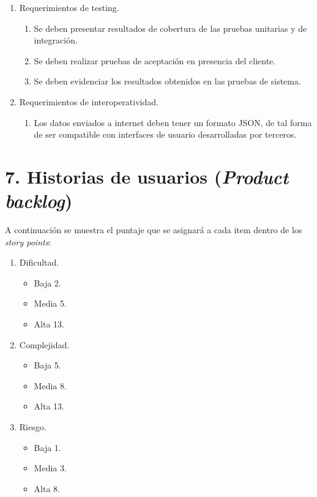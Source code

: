 \documentclass[
11pt, %
codirector, %
]{charter}
\begin{document}
\begin{enumerate}
	\item Requerimientos de testing.
		\begin{enumerate}
			\item Se deben presentar resultados de cobertura de las pruebas unitarias y de integración.
			\item Se deben realizar pruebas de aceptación en presencia del cliente.
			\item Se deben evidenciar los resultados obtenidos en las pruebas de sistema.
		\end{enumerate}

	\item Requerimientos de interoperatividad.
		\begin{enumerate}
			\item Los datos enviados a internet deben tener un formato JSON, de tal forma de ser compatible con interfaces de usuario desarrolladas por terceros.
		\end{enumerate}
					
\end{enumerate}

\section{7. Historias de usuarios (\textit{Product backlog})}
\label{sec:backlog}

A continuación se muestra el puntaje que se asignará a cada item dentro de los \textit{story points}:

\begin{enumerate}
	\item Dificultad.
	\begin{itemize}
		\item Baja 2.
		\item Media 5.
		\item Alta 13.
	\end{itemize}

\item Complejidad.
	\begin{itemize}
		\item Baja 5.
		\item Media 8.
		\item Alta 13.
	\end{itemize}

\item Riesgo.
	\begin{itemize}
		\item Baja 1.
		\item Media 3.
		\item Alta 8.
	\end{itemize}
\end{enumerate}
\end{document}
